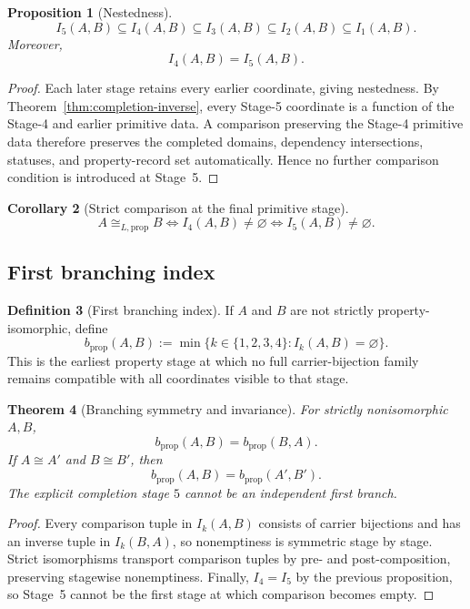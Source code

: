 \documentclass[11pt]{article}
\newtheorem{theorem}{Theorem}[section]
\newtheorem{proposition}[theorem]{Proposition}
\newtheorem{corollary}[theorem]{Corollary}
\theoremstyle{definition}
\newtheorem{definition}[theorem]{Definition}
\theoremstyle{remark}
\begin{document}
\begin{proposition}[Nestedness]
\[
I_5(A,B)\subseteq I_4(A,B)\subseteq I_3(A,B)\subseteq I_2(A,B)\subseteq I_1(A,B).
\]
Moreover,
\[
I_4(A,B)=I_5(A,B).
\]
\end{proposition}

\begin{proof}
Each later stage retains every earlier coordinate, giving nestedness.
By Theorem~\ref{thm:completion-inverse}, every Stage-5 coordinate is a function of the Stage-4 and earlier primitive data.
A comparison preserving the Stage-4 primitive data therefore preserves the completed domains, dependency intersections, statuses, and property-record set automatically.
Hence no further comparison condition is introduced at Stage~5.
\end{proof}

\begin{corollary}[Strict comparison at the final primitive stage]
\[
A\cong_{L,\mathrm{prop}}B
\Longleftrightarrow
I_4(A,B)\neq\varnothing
\Longleftrightarrow
I_5(A,B)\neq\varnothing.
\]
\end{corollary}

\subsection{First branching index}

\begin{definition}[First branching index]
If \(A\) and \(B\) are not strictly property-isomorphic, define
\[
b_{\mathrm{prop}}(A,B):=
\min\{k\in\{1,2,3,4\}:I_k(A,B)=\varnothing\}.
\]
This is the earliest property stage at which no full carrier-bijection family remains compatible with all coordinates visible to that stage.
\end{definition}

\begin{theorem}[Branching symmetry and invariance]
\label{thm:branching-invariance}
For strictly nonisomorphic \(A,B\),
\[
b_{\mathrm{prop}}(A,B)=b_{\mathrm{prop}}(B,A).
\]
If \(A\cong A'\) and \(B\cong B'\), then
\[
b_{\mathrm{prop}}(A,B)=b_{\mathrm{prop}}(A',B').
\]
The explicit completion stage \(5\) cannot be an independent first branch.
\end{theorem}

\begin{proof}
Every comparison tuple in \(I_k(A,B)\) consists of carrier bijections and has an inverse tuple in \(I_k(B,A)\), so nonemptiness is symmetric stage by stage.
Strict isomorphisms transport comparison tuples by pre- and post-composition, preserving stagewise nonemptiness.
Finally, \(I_4=I_5\) by the previous proposition, so Stage~5 cannot be the first stage at which comparison becomes empty.
\end{proof}
\end{document}
